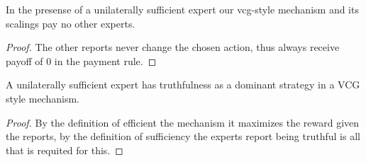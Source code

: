 \begin{lem}
	In the presense of a unilaterally sufficient expert our vcg-style mechanism and its scalings pay no other experts.
\end{lem}

\begin{proof}
    The other reports never change the chosen action, thus always receive payoff of 0 in the payment rule.
\end{proof}


\begin{lem}
	A unilaterally sufficient expert has truthfulness as a dominant strategy in a VCG style mechanism.
\end{lem}

\begin{proof}
    By the definition of efficient the mechanism it maximizes the reward given the reports, by the definition of sufficiency the experts report being truthful is all that is requited for this.
\end{proof}





